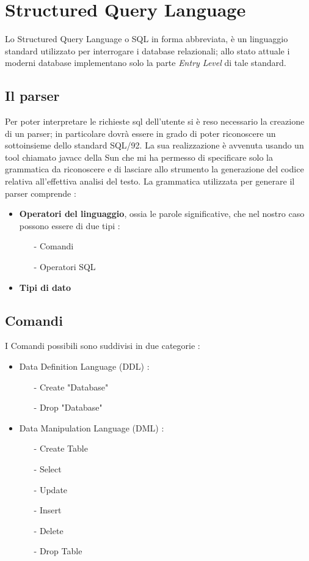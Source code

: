 \section{Structured Query Language}

Lo Structured Query Language o SQL in forma abbreviata, è un linguaggio standard utilizzato per interrogare i database relazionali; allo stato attuale i moderni database implementano solo la parte \emph{Entry Level} di tale standard. 

\subsection{Il parser}
Per poter interpretare le richieste sql dell'utente si è reso necessario la creazione di un parser; in particolare dovrà essere in grado di poter riconoscere un sottoinsieme dello standard SQL/92. La sua realizzazione è avvenuta usando un tool chiamato javacc della Sun che mi ha permesso di specificare solo la grammatica da riconoscere e di lasciare allo strumento la generazione del codice relativa all'effettiva analisi del testo. La grammatica utilizzata per generare il parser comprende :
\begin{itemize}
\item {\bf Operatori del linguaggio}, ossia le parole significative, che nel nostro caso possono essere di due tipi : 
\begin{itemize}
\item[-] Comandi
\item[-] Operatori SQL
\end{itemize}
\item {\bf Tipi di dato}
\end{itemize}

\subsection{Comandi}
I Comandi possibili sono suddivisi in due categorie :
\begin{itemize}
\item Data Definition Language (DDL) :
\begin{itemize}
\item[-] Create "Database"
\item[-] Drop "Database"
\end{itemize}
\item Data Manipulation Language (DML) :
\begin{itemize}
\item[-] Create Table
\item[-] Select
\item[-] Update
\item[-] Insert 
\item[-] Delete
\item[-] Drop Table
\end{itemize}
\end{itemize}

